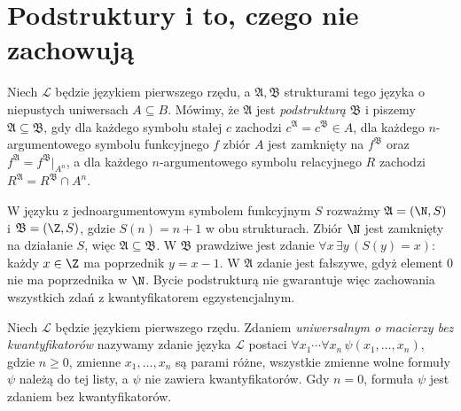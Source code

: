 \section{Podstruktury i to, czego nie zachowują}\label{sec:model-substructure}
\begin{definicja}[Podstruktura]\label{def:model-substructure}
Niech $\mathcal L$ będzie językiem pierwszego rzędu,
a $\mathfrak A,\mathfrak B$ strukturami tego języka
o niepustych uniwersach $A\subseteq B$.
Mówimy, że $\mathfrak A$ jest
\emph{podstrukturą} $\mathfrak B$ i piszemy
$\mathfrak A\subseteq\mathfrak B$, gdy dla każdego symbolu
stałej $c$ zachodzi $c^{\mathfrak A}=c^{\mathfrak B}\in A$,
dla każdego $n$-argumentowego symbolu funkcyjnego $f$
zbiór $A$ jest zamknięty na $f^{\mathfrak B}$ oraz
$f^{\mathfrak A}=f^{\mathfrak B}|_{A^n}$,
a dla każdego $n$-argumentowego symbolu relacyjnego $R$
zachodzi $R^{\mathfrak A}=R^{\mathfrak B}\cap A^n$.
\end{definicja}

\begin{przyklad}
W języku z jednoargumentowym symbolem funkcyjnym $S$
rozważmy $\mathfrak A=(\N,S)$ i $\mathfrak B=(\Z,S)$,
gdzie $S(n)=n+1$ w obu strukturach. Zbiór $\N$
jest zamknięty na działanie $S$, więc
$\mathfrak A\subseteq\mathfrak B$.
W $\mathfrak B$ prawdziwe jest zdanie
$\forall x\,\exists y\,(S(y)=x)$: każdy $x\in\Z$
ma poprzednik $y=x-1$. W $\mathfrak A$ zdanie jest fałszywe,
gdyż element $0$ nie ma poprzednika w $\N$.
Bycie podstrukturą nie gwarantuje więc zachowania
wszystkich zdań z kwantyfikatorem egzystencjalnym.
\end{przyklad}

\begin{definicja}
Niech $\mathcal L$ będzie językiem pierwszego rzędu.
Zdaniem \emph{uniwersalnym o macierzy bez kwantyfikatorów}
nazywamy zdanie języka $\mathcal L$ postaci
$\forall x_1\cdots\forall x_n\,\psi(x_1,\ldots,x_n)$,
gdzie $n\geq 0$, zmienne $x_1,\ldots,x_n$ są parami różne,
wszystkie zmienne wolne formuły $\psi$ należą do tej listy,
a $\psi$ nie zawiera kwantyfikatorów. Gdy $n=0$,
formuła $\psi$ jest zdaniem bez kwantyfikatorów.
\end{definicja}

